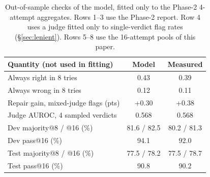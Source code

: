 \begin{table}[t]
\centering\small
\begin{tabular}{@{}lcc@{}}
\toprule
Quantity (not used in fitting) & Model & Measured \\
\midrule
Always right in 8 tries & 0.43 & 0.39 \\
Always wrong in 8 tries & 0.12 & 0.11 \\
Repair gain, mixed-judge flags (pts) & +0.30 & +0.38 \\
Judge AUROC, 4 sampled verdicts & 0.568 & 0.568 \\
Dev majority@8 / @16 (\%) & 81.6 / 82.5 & 80.2 / 81.3 \\
Dev pass@16 (\%) & 94.1 & 92.0 \\
Test majority@8 / @16 (\%) & 77.5 / 78.2 & 77.5 / 78.7 \\
Test pass@16 (\%) & 90.8 & 90.2 \\
\bottomrule
\end{tabular}
\caption{Out-of-sample checks of the model, fitted only to the Phase-2 4-attempt aggregates. Rows 1--3 use the
Phase-2 report. Row 4 uses a judge fitted only to single-verdict flag rates (\S\ref{sec:lenient}). Rows 5--8 use the
16-attempt pools of this paper.}
\label{tab:validation}
\end{table}
